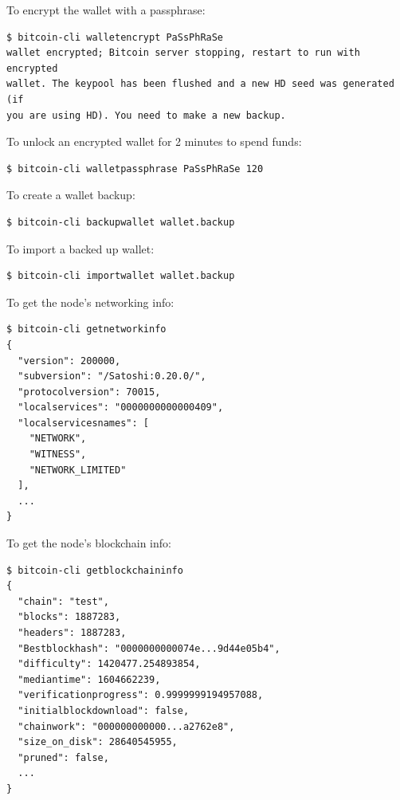 \noindent To encrypt the wallet with a passphrase:
\begin{emphbox}
\begin{lstlisting}[style=Bash]
$ bitcoin-cli walletencrypt PaSsPhRaSe
wallet encrypted; Bitcoin server stopping, restart to run with encrypted 
wallet. The keypool has been flushed and a new HD seed was generated (if 
you are using HD). You need to make a new backup.
\end{lstlisting}
\end{emphbox}
\vspace{1em}

\noindent To unlock an encrypted wallet for 2 minutes to spend funds:
\begin{emphbox}
\begin{lstlisting}[style=Bash]
$ bitcoin-cli walletpassphrase PaSsPhRaSe 120
\end{lstlisting}
\end{emphbox}
\vspace{1em}

\noindent To create a wallet backup:
\begin{emphbox}
\begin{lstlisting}[style=Bash]
$ bitcoin-cli backupwallet wallet.backup
\end{lstlisting}
\end{emphbox}
\vspace{1em}

\noindent To import a backed up wallet:
\begin{emphbox}
\begin{lstlisting}[style=Bash]
$ bitcoin-cli importwallet wallet.backup
\end{lstlisting}
\end{emphbox}
\vspace{1em}

\noindent To get the node's networking info:
\begin{emphbox}
\begin{lstlisting}[style=Bash]
$ bitcoin-cli getnetworkinfo
{
  "version": 200000,
  "subversion": "/Satoshi:0.20.0/",
  "protocolversion": 70015,
  "localservices": "0000000000000409",
  "localservicesnames": [
    "NETWORK",
    "WITNESS",
    "NETWORK_LIMITED"
  ],
  ... 
}
\end{lstlisting}
\end{emphbox}
\vspace{1em}

\noindent To get the node's blockchain info:
\begin{emphbox}
\begin{lstlisting}[style=Bash]
$ bitcoin-cli getblockchaininfo
{
  "chain": "test",
  "blocks": 1887283,
  "headers": 1887283,
  "Bestblockhash": "0000000000074e...9d44e05b4",
  "difficulty": 1420477.254893854,
  "mediantime": 1604662239,
  "verificationprogress": 0.9999999194957088,
  "initialblockdownload": false,
  "chainwork": "000000000000...a2762e8",
  "size_on_disk": 28640545955,
  "pruned": false,
  ...
}
\end{lstlisting}
\end{emphbox}
\vspace{1em}


